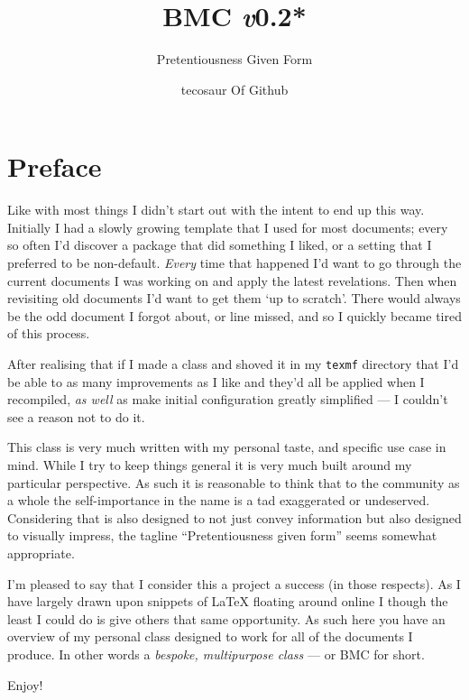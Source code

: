 \documentclass[solid,math,chem,code,plot]{bmc}
\title{\texorpdfstring{BMC \hfill \fontsize{1.35cm}{1.35cm}\fontseries{t}\selectfont \emph{v}0.2*}{BMC v0.2*}}
\subtitle{Pretentiousness Given Form}
\author{tecosaur \footnotesize \newline Of Github}
\begin{document}
\maketitle

\section*{Preface}

\vspace{1cm}

Like with most things I didn't start out with the intent to end up this way.
Initially I had a slowly growing template that I used for most documents;
every so often I'd discover a package that did something I liked,
or a setting that I preferred to be non-default.
\emph{Every} time that happened I'd want to go through the current documents I was working on
and apply the latest revelations.
Then when revisiting old documents I'd want to get them `up to scratch'.
There would always be the odd document I forgot about, or line missed,
and so I quickly became tired of this process.

After realising that if I made a class and shoved it in my \verb|texmf|
directory that I'd be able to as many improvements as I like and they'd all
be applied when I recompiled, \emph{as well} as make initial configuration
greatly simplified --- I couldn't see a reason not to do it.

This class is very much written with my personal taste, and specific use case in mind.
While I try to keep things general it is very much built around my particular perspective.
As such it is reasonable to think that to the community as a whole the
self-importance in the name is a tad exaggerated or undeserved.
Considering that is also designed to not just convey information but also
designed to visually impress, the tagline ``Pretentiousness given form''
seems somewhat appropriate.

I'm pleased to say that I consider this a project a success (in those respects).
As I have largely drawn upon snippets of LaTeX floating around online
I though the least I could do is give others that same opportunity.
As such here you have an overview of my personal class
designed to work for all of the documents I produce.
In other words a \emph{bespoke, multipurpose class} --- or BMC for short.

\vspace{1cm}

Enjoy!
\end{document}
